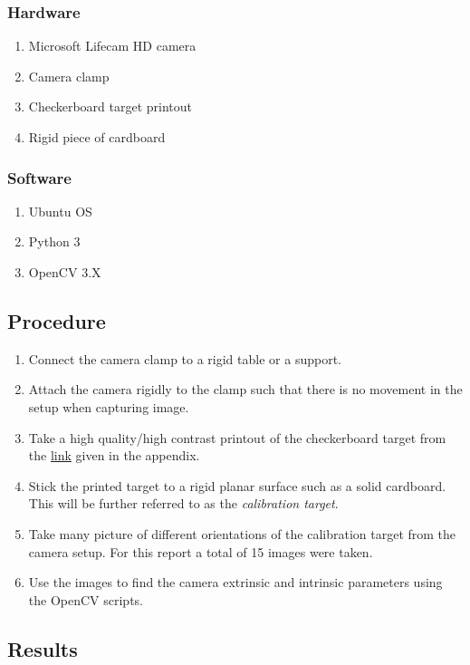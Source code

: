 \subsubsection{Hardware}
\begin{enumerate}
	\item Microsoft Lifecam HD camera
	\item Camera clamp 
	\item Checkerboard target printout
	\item Rigid piece of cardboard 
\end{enumerate}

\subsubsection{Software}
\begin{enumerate}
	\item Ubuntu OS 
	\item Python 3 
	\item OpenCV 3.X
\end{enumerate}

\subsection{Procedure} \label{procedure}
\begin{enumerate}
	\item Connect the camera clamp to a rigid table or a support. 
	\item Attach the camera rigidly to the clamp such that there is no movement in the setup when capturing image.
	\item Take a high quality/high contrast printout of the checkerboard target from the \href{https://www.mrpt.org/downloads/camera-calibration-checker-board_9x7.pdf}{link} given in the appendix.
	\item Stick the printed target to a rigid planar surface such as a solid cardboard. This will be further referred to as the \textit{calibration target}.
	\item Take many picture of different orientations of the calibration target from the camera setup. For this report a total of 15 images were taken.
	\item Use the images to find the camera extrinsic and intrinsic parameters using the OpenCV scripts.
\end{enumerate}


\subsection{Results}

